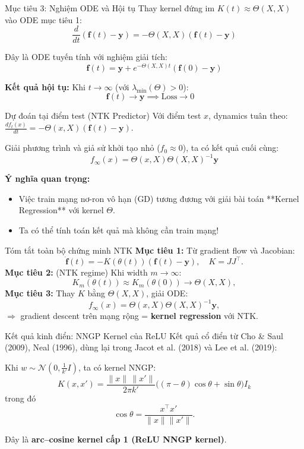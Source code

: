 \begin{frame}{Mục tiêu 3: Nghiệm ODE và Hội tụ}
  Thay kernel đứng im $K(t) \approx \Theta(X,X)$ vào ODE mục tiêu 1:
  \[ \frac{d}{dt}(\mathbf{f}(t) - \mathbf{y}) = -\Theta(X,X)(\mathbf{f}(t) - \mathbf{y}) \]
  
  Đây là ODE tuyến tính với nghiệm giải tích:
  \[ \mathbf{f}(t) = \mathbf{y} + e^{-\Theta(X,X)t}(\mathbf{f}(0) - \mathbf{y}) \]
  
  \textbf{Kết quả hội tụ:} Khi $t \to \infty$ (với $\lambda_{\min}(\Theta) > 0$):
  \[ \mathbf{f}(t) \to \mathbf{y} \implies \text{Loss} \to 0 \quad \]
\end{frame}

\begin{frame}{Dự đoán tại điểm test (NTK Predictor)}
  Với điểm test $x$, dynamics tuân theo: $\frac{df_t(x)}{dt} = -\Theta(x,X)(\mathbf f(t) - \mathbf y)$.
  
  Giải phương trình và giả sử khởi tạo nhỏ ($f_0 \approx 0$), ta có kết quả cuối cùng:
  \[
    \boxed{ f_\infty(x) = \Theta(x,X)\Theta(X,X)^{-1}\mathbf y }
  \]

  \textbf{Ý nghĩa quan trọng:}
  \begin{itemize}
    \item Việc train mạng nơ-ron vô hạn (GD) tương đương với giải bài toán **Kernel Regression** với kernel $\Theta$.
    \item Ta có thể tính toán kết quả mà không cần train mạng!
  \end{itemize}
\end{frame}

\begin{frame}{Tóm tắt toàn bộ chứng minh NTK}
     \textbf{Mục tiêu 1:}  
          Từ gradient flow và Jacobian:
          \[
            \dot{\mathbf f}(t)
            = -K(\theta(t))(\mathbf f(t)-\mathbf y),
            \quad K = JJ^\top.
          \]
     \textbf{Mục tiêu 2:} (NTK regime)  
          Khi width $m\to\infty$:
          \[
            K_m(\theta(t)) \approx K_m(\theta(0)) \to \Theta(X,X),
          \]
     \textbf{Mục tiêu 3:}  
          Thay $K$ bằng $\Theta(X,X)$, giải ODE:
          \[
            f_\infty(x)
            = \Theta(x,X)\Theta(X,X)^{-1}\mathbf y,
          \]
          $\Rightarrow$ gradient descent trên mạng rộng = \textbf{kernel regression} với NTK.
\end{frame}

\begin{frame}{Kết quả kinh điển: NNGP Kernel của ReLU}
Kết quả cổ điển từ Cho \& Saul (2009), Neal (1996), dùng lại trong
Jacot et al. (2018) và Lee et al. (2019):

\vspace{0.2cm}
Khi $w \sim \mathcal N(0,\tfrac{1}{k'}I)$, ta có kernel NNGP:
\[
K(x,x')
=
\frac{\|x\|\,\|x'\|}{2\pi k'}
\Big(
(\pi - \theta)\cos\theta + \sin\theta
\Big)
I_k
\]
trong đó
\[
\cos\theta
=
\frac{x^\top x'}{\|x\|\|x'\|}.
\]

\vspace{0.2cm}
Đây là \textbf{arc--cosine kernel cấp 1 (ReLU NNGP kernel)}.
\end{frame}

